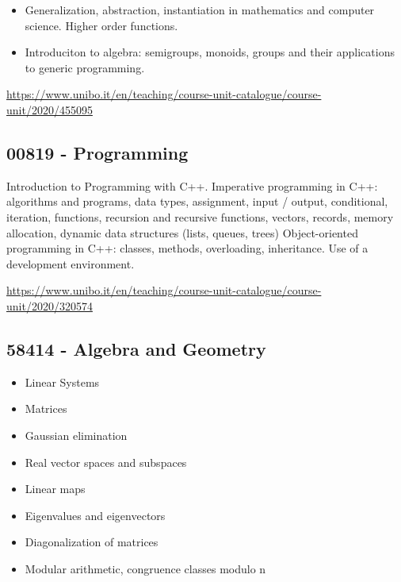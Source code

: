 \documentclass{article}
\begin{document}
\begin{itemize}
    \item Generalization, abstraction, instantiation in mathematics and computer science. Higher order functions.
    \item Introduciton to algebra: semigroups, monoids, groups and their applications to generic programming.
\end{itemize}

\url{https://www.unibo.it/en/teaching/course-unit-catalogue/course-unit/2020/455095}

\subsection{00819 - Programming}

Introduction to Programming with C++.
Imperative programming in C++: algorithms and programs, data types, assignment, input / output, conditional, iteration, functions, recursion and recursive functions, vectors, records, memory allocation, dynamic data structures (lists, queues, trees)
Object-oriented programming in C++: classes, methods, overloading, inheritance.
Use of a development environment.

\url{https://www.unibo.it/en/teaching/course-unit-catalogue/course-unit/2020/320574}

\subsection{58414 - Algebra and Geometry}

\begin{itemize}
\item Linear Systems

\item Matrices

\item Gaussian elimination

\item Real vector spaces and subspaces

\item Linear maps

\item Eigenvalues and eigenvectors

\item Diagonalization of matrices

\item Modular arithmetic, congruence classes modulo n

\end{itemize}
\end{document}
